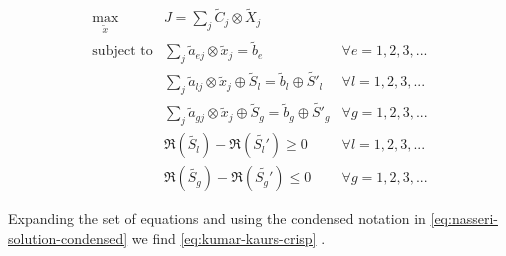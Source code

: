 \documentclass[ee,thesis]{usuthesis}
\begin{document}
\begin{equation}
\label{eq:kumar-kaurs-fuzzy}
\begin{array}{lll}
\underset{{\tilde{x}}}{\text{max}} & J = \sum_j \tilde{C}_j \otimes \tilde{X}_j              &                                              \\
\text{subject to} & \sum_j \tilde{a}_{ej} \otimes \tilde{x}_j               = \tilde{b}_e & \forall e = 1,2,3,...                \\
                  & \sum_j \tilde{a}_{lj} \otimes \tilde{x}_j \oplus \tilde{S}_l = \tilde{b}_l \oplus \tilde{S'}_l & \forall l = 1,2,3,... \\
                  & \sum_j \tilde{a}_{gj} \otimes \tilde{x}_j \oplus \tilde{S}_g = \tilde{b}_g \oplus \tilde{S'}_g & \forall g = 1,2,3,... \\
                  & \mathfrak{R}(\tilde{S_l}) - \mathfrak{R}(\tilde{S_l'}) \ge 0                                     & \forall l = 1,2,3,...      \\
                  & \mathfrak{R}(\tilde{S_g}) - \mathfrak{R}(\tilde{S_g'}) \le 0                                     & \forall g = 1,2,3,...
\end{array}
\end{equation}

Expanding the set of equations and using the condensed notation in \ref{eq:nasseri-solution-condensed} we find
\ref{eq:kumar-kaurs-crisp} \cite{kaur-2016-introd-fuzzy}.
\end{document}

